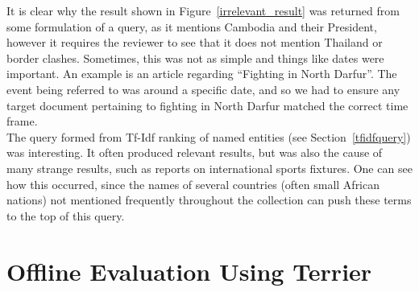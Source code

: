 \documentclass{l4proj}
\begin{document}
It is clear why the result shown in Figure~\ref{irrelevant_result} was returned from some formulation of a query, as it mentions Cambodia and their President, however it requires the reviewer to see that it does not mention Thailand or border clashes. Sometimes, this was not as simple and things like dates were important. An example is an article regarding ``Fighting in North Darfur''. The event being referred to was around a specific date, and so we had to ensure any target document pertaining to fighting in North Darfur matched the correct time frame. \\
The query formed from Tf-Idf ranking of named entities (see Section~\ref{tfidfquery}) was interesting. It often produced relevant results, but was also the cause of many strange results, such as reports on international sports fixtures. One can see how this occurred, since the names of several countries (often small African nations) not mentioned frequently throughout the collection can push these terms to the top of this query.

\section{Offline Evaluation Using Terrier}\label{offlineevaluation}
\end{document}
